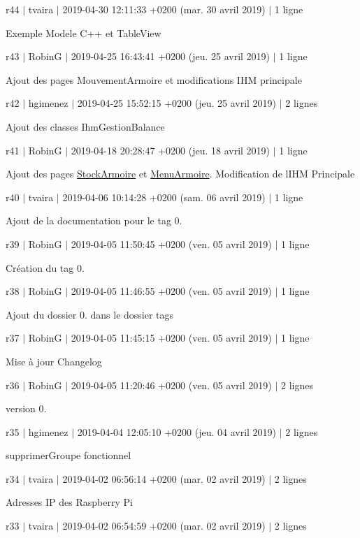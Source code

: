 r44 $\vert$ tvaira $\vert$ 2019-\/04-\/30 12\+:11\+:33 +0200 (mar. 30 avril 2019) $\vert$ 1 ligne

Exemple Modele C++ et Table\+View

r43 $\vert$ RobinG $\vert$ 2019-\/04-\/25 16\+:43\+:41 +0200 (jeu. 25 avril 2019) $\vert$ 1 ligne

Ajout des pages Mouvement\+Armoire et modifications I\+HM principale

r42 $\vert$ hgimenez $\vert$ 2019-\/04-\/25 15\+:52\+:15 +0200 (jeu. 25 avril 2019) $\vert$ 2 lignes

Ajout des classes Ihm\+Gestion\+Balance

r41 $\vert$ RobinG $\vert$ 2019-\/04-\/18 20\+:28\+:47 +0200 (jeu. 18 avril 2019) $\vert$ 1 ligne

Ajout des pages \hyperlink{class_stock_armoire}{Stock\+Armoire} et \hyperlink{class_menu_armoire}{Menu\+Armoire}. Modification de l\textquotesingle{}I\+HM Principale

r40 $\vert$ tvaira $\vert$ 2019-\/04-\/06 10\+:14\+:28 +0200 (sam. 06 avril 2019) $\vert$ 1 ligne

Ajout de la documentation pour le tag 0.

r39 $\vert$ RobinG $\vert$ 2019-\/04-\/05 11\+:50\+:45 +0200 (ven. 05 avril 2019) $\vert$ 1 ligne

Création du tag 0.

r38 $\vert$ RobinG $\vert$ 2019-\/04-\/05 11\+:46\+:55 +0200 (ven. 05 avril 2019) $\vert$ 1 ligne

Ajout du dossier 0. dans le dossier tags

r37 $\vert$ RobinG $\vert$ 2019-\/04-\/05 11\+:45\+:15 +0200 (ven. 05 avril 2019) $\vert$ 1 ligne

Mise à jour Changelog

r36 $\vert$ RobinG $\vert$ 2019-\/04-\/05 11\+:20\+:46 +0200 (ven. 05 avril 2019) $\vert$ 2 lignes

version 0.

r35 $\vert$ hgimenez $\vert$ 2019-\/04-\/04 12\+:05\+:10 +0200 (jeu. 04 avril 2019) $\vert$ 2 lignes

supprimer\+Groupe fonctionnel

r34 $\vert$ tvaira $\vert$ 2019-\/04-\/02 06\+:56\+:14 +0200 (mar. 02 avril 2019) $\vert$ 2 lignes

Adresses IP des Raspberry Pi

r33 $\vert$ tvaira $\vert$ 2019-\/04-\/02 06\+:54\+:59 +0200 (mar. 02 avril 2019) $\vert$ 2 lignes

